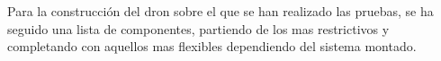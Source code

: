 
 Para la construcción del dron sobre el que se han realizado las pruebas, se ha seguido una lista de componentes, partiendo de los mas restrictivos y completando con aquellos mas flexibles dependiendo del sistema montado.